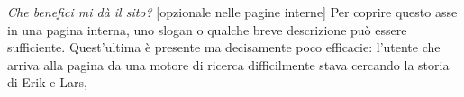 \textit{Che benefici mi dà il sito?} [opzionale nelle pagine interne] \newline
Per coprire questo asse in una pagina interna, uno slogan o qualche breve descrizione può essere sufficiente. Quest'ultima è presente ma decisamente poco efficacie: l'utente che arriva alla pagina da una motore di ricerca difficilmente stava cercando la storia di Erik e Lars, 